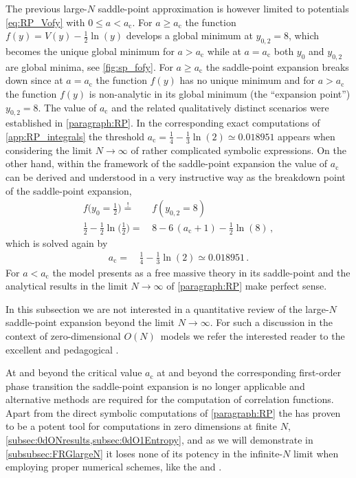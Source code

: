 The previous large-$N$ saddle-point approximation is however limited to potentials \eqref{eq:RP_Vofy} with $0 \leq a < a_\mathrm{c}$.
For $a\geq a_\mathrm{c}$ the function ${f ( y ) = V ( y ) - \tfrac{1}{2} \ln ( y )}$ develops a global minimum at $y_{0,2} = 8$, which becomes the unique global minimum for $a>a_\mathrm{c}$ while at $a=a_\mathrm{c}$ both $y_0$ and $y_{0,2}$ are global minima, see \cref{fig:sp_fofy}. 
For $a\geq a_\mathrm{c}$ the saddle-point expansion breaks down since at $a=a_\mathrm{c}$ the function $f(y)$ has no unique minimum and for $a>a_\mathrm{c}$ the function $f(y)$ is non-analytic in its global minimum (the ``expansion point'') $y_{0,2}=8$.
The value of $a_\mathrm{c}$ and the related qualitatively distinct scenarios were established in \cref{paragraph:RP}.
In the corresponding exact computations of \cref{app:RP_integrals} the threshold ${a_\mathrm{c}= \tfrac{1}{4} - \tfrac{1}{3} \ln ( 2 ) \simeq 0.018951}$ appears when considering the limit ${N \rightarrow \infty}$ of rather complicated symbolic expressions.
On the other hand, within the framework of the saddle-point expansion the value of $a_\mathrm{c}$ can be derived and understood in a very instructive way as the breakdown point of the saddle-point expansion,
\begin{subequations}\label{eq:saddle_minima}
	\begin{align}
		f \big( y_0 = \tfrac{1}{2} \big) \overset{!}{=} \, & f ( y_{0,2} = 8 )\\[.2em]
		\tfrac{1}{2} - \tfrac{1}{2} \ln \big( \tfrac{1}{2} \big) = \, & 8 - 6 \, ( a_\mathrm{c} + 1 ) - \tfrac{1}{2} \ln ( 8 ) \, ,
	\end{align}
\end{subequations}
which is solved again by
	\begin{align}
		a_\mathrm{c} = \, & \tfrac{1}{4} - \tfrac{1}{3} \ln ( 2 ) \simeq 0.018951 \, .
	\end{align}
	For $a<a_\mathrm{c}$ the model presents as a free massive theory in its saddle-point and the analytical results in the limit ${N \rightarrow \infty}$ of \cref{paragraph:RP} make perfect sense.
	
	In this subsection we are not interested in a quantitative review of the large-$N$ saddle-point expansion beyond the limit ${N \rightarrow \infty}$.
	For such a discussion in the context of zero-dimensional $O(N)$~models we refer the interested reader to the excellent and pedagogical .
	
	At and beyond the critical value $a_\mathrm{c}$ \dash{} at and beyond the corresponding first-order phase transition \dash{} the saddle-point expansion is no longer applicable and alternative methods are required for the computation of correlation functions.
	Apart from the direct symbolic computations of \cref{paragraph:RP} the \frg{} has proven to be a potent tool for computations in zero dimensions at finite $N$, \cf{} \cref{subsec:0dONresults,subsec:0dO1Entropy},  and as we will demonstrate in \cref{subsubsec:FRGlargeN} it loses none of its potency in the infinite-$N$ limit when employing proper numerical schemes, like the \kt{} and \knpScheme{}.

